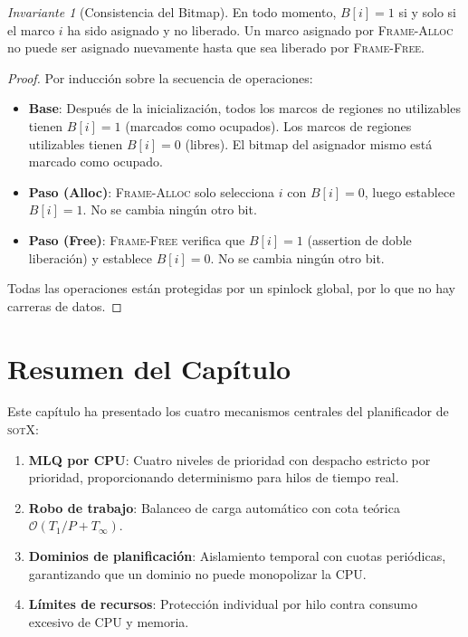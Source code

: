 \documentclass[11pt,twoside,openright]{book}
\theoremstyle{definition}
\theoremstyle{plain}
\theoremstyle{remark}
\newtheorem{invariant}{Invariante}[chapter]
\newcommand{\sotos}{\textsc{sotX}}
\newcommand{\bigO}{\mathcal{O}}
\begin{document}
\begin{invariant}[Consistencia del Bitmap]
\label{inv:bitmap-consistency}
En todo momento, $B[i] = 1$ si y solo si el marco $i$ ha sido asignado y no liberado.
Un marco asignado por \textsc{Frame-Alloc} no puede ser asignado nuevamente hasta que
sea liberado por \textsc{Frame-Free}.
\end{invariant}

\begin{proof}
Por inducción sobre la secuencia de operaciones:
\begin{itemize}
    \item \textbf{Base}: Después de la inicialización, todos los marcos de regiones
          no utilizables tienen $B[i] = 1$ (marcados como ocupados). Los marcos de
          regiones utilizables tienen $B[i] = 0$ (libres). El bitmap del asignador
          mismo está marcado como ocupado.
    \item \textbf{Paso (Alloc)}: \textsc{Frame-Alloc} solo selecciona $i$ con $B[i] = 0$,
          luego establece $B[i] = 1$. No se cambia ningún otro bit.
    \item \textbf{Paso (Free)}: \textsc{Frame-Free} verifica que $B[i] = 1$ (assertion
          de doble liberación) y establece $B[i] = 0$. No se cambia ningún otro bit.
\end{itemize}
Todas las operaciones están protegidas por un spinlock global, por lo que no hay carreras
de datos.
\end{proof}

\section{Resumen del Capítulo}

Este capítulo ha presentado los cuatro mecanismos centrales del planificador de \sotos{}:

\begin{enumerate}
    \item \textbf{MLQ por CPU}: Cuatro niveles de prioridad con despacho estricto por
          prioridad, proporcionando determinismo para hilos de tiempo real.
    \item \textbf{Robo de trabajo}: Balanceo de carga automático con cota teórica
          $\bigO(T_1/P + T_\infty)$.
    \item \textbf{Dominios de planificación}: Aislamiento temporal con cuotas periódicas,
          garantizando que un dominio no puede monopolizar la CPU.
    \item \textbf{Límites de recursos}: Protección individual por hilo contra consumo
          excesivo de CPU y memoria.
\end{enumerate}
\end{document}
